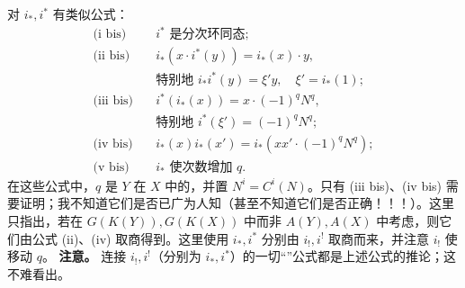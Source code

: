 对 $i_*,i^*$ 有类似公式：
\[
\begin{aligned}
\text{(i bis)}\quad&i^*\text{ 是分次环同态};\\
\text{(ii bis)}\quad&i_*(x\cdot i^*(y))=i_*(x)\cdot y,\\
&\text{特别地 }i_*i^*(y)=\xi'y,\quad\xi'=i_*(1);\\
\text{(iii bis)}\quad&i^*(i_*(x))=x\cdot(-1)^qN^q,\\
&\text{特别地 }i^*(\xi')=(-1)^qN^q;\\
\text{(iv bis)}\quad&i_*(x)i_*(x')=i_*(xx'\cdot(-1)^qN^q);\\
\text{(v bis)}\quad&i_*\text{ 使次数增加 }q.
\end{aligned}
\]
在这些公式中，$q$ 是 $Y$ 在 $X$ 中的，并置 $N^i=C^i(N)$。只有 (iii bis)、(iv bis) 需要证明；我不知道它们是否已广为人知（甚至不知道它们是否正确！！！）。这里只指出，若在 $G(K(Y)),G(K(X))$ 中而非 $A(Y),A(X)$ 中考虑，则它们由公式 (ii)、(iv) 取商得到。这里使用 $i_*,i^*$ 分别由 $i_!,i^!$ 取商而来，并注意 $i_!$ 使移动 $q$。
\textbf{注意。} 连接 $i_!,i^!$（分别为 $i_*,i^*$）的一切“”公式都是上述公式的推论；这不难看出。

